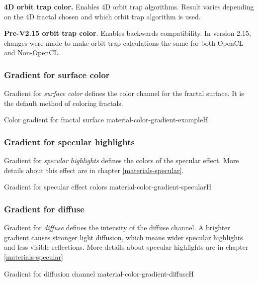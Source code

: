 \textbf{4D orbit trap color.} Enables 4D orbit trap algorithms. Result varies depending on the 4D fractal chosen and which orbit trap algorithm is used.

\textbf{Pre-V2.15 orbit trap color}. Enables backwards compatibility. In version 2.15, changes were made to make orbit trap calculations the same for both OpenCL and  Non-OpenCL.

\subsubsection{Gradient for surface color}\label{materials-surface_color-gradient}

Gradient for \emph{surface color} defines the color channel for the fractal surface. It is the default method of coloring fractals.

{Color gradient for fractal surface}
{material-color-gradient-example}{H}

\subsubsection{Gradient for specular highlights}\label{materials-specular-gradient}

Gradient for \emph{specular highlights} defines the colors of the specular effect. More details about this effect are in chapter \ref{materials-specular}.

{Gradient for specular effect colors}
{material-color-gradient-specular}{H}

\subsubsection{Gradient for diffuse}\label{materials-diffuse-gradient}

Gradient for \emph{diffuse} defines the intensity of the diffuse channel. A brighter gradient causes stronger light diffusion, which means wider specular highlights and less visible reflections. More details about specular highlights are in chapter \ref{materials-specular}

{Gradient for diffusion channel}
{material-color-gradient-diffuse}{H}

